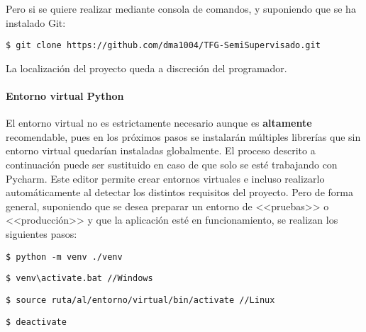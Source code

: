 Pero si se quiere realizar mediante consola de comandos, y suponiendo que se ha
instalado Git:

\begin{tcolorbox}[colback=cyan!5!white,colframe=cyan!75!black,fontupper=\footnotesize,title=Clonación de repositorio desde consola]
\begin{verbatim}
$ git clone https://github.com/dma1004/TFG-SemiSupervisado.git
\end{verbatim}
\end{tcolorbox}
La localización del proyecto queda a discreción del programador.
\paragraph{Entorno virtual Python} El entorno virtual no es estrictamente
necesario aunque es \textbf{altamente} recomendable, pues en los próximos pasos
se instalarán múltiples librerías que sin entorno virtual quedarían instaladas
globalmente. El proceso descrito a continuación puede ser sustituido en caso de
que solo se esté trabajando con Pycharm. Este editor permite crear entornos
virtuales e incluso realizarlo automáticamente al detectar los distintos
requisitos del proyecto. Pero de forma general, suponiendo que se desea preparar
un entorno de <<pruebas>> o <<producción>> y que la aplicación esté en
funcionamiento, se realizan los siguientes pasos:
\begin{tcolorbox}[colback=cyan!5!white,colframe=orange!75!black,title=Creación del entorno virtual (dentro de la carpeta deseado)]
\begin{verbatim}
$ python -m venv ./venv
\end{verbatim}
\end{tcolorbox}


\begin{tcolorbox}[colback=cyan!5!white,colframe=cyan!75!black,fontupper=\footnotesize,fontlower=\footnotesize,title=Activación del entorno virtual]
\begin{verbatim}
$ venv\activate.bat //Windows
\end{verbatim}
\tcblower
\begin{verbatim}
$ source ruta/al/entorno/virtual/bin/activate //Linux
\end{verbatim}
\end{tcolorbox}

\begin{tcolorbox}[colback=cyan!5!white,colframe=cyan!75!black,title=Para desactivar el entorno (una vez en él)]
\begin{verbatim}
$ deactivate
\end{verbatim}
\end{tcolorbox}
